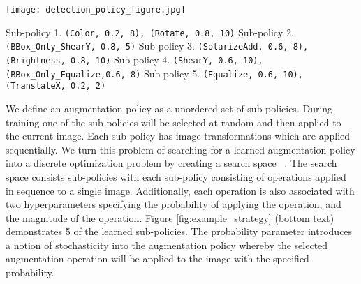 \documentclass[10pt,twocolumn,letterpaper]{article}
\newcommand{\cmd}[1]{{\tt #1}}
\begin{document}
\begin{figure*}[t]
\centering
\texttt{[image: detection\_policy\_figure.jpg]}
\vspace{-0.2cm}
\small{
\begin{flushleft}
\hspace*{4.4cm} Sub-policy 1. \cmd{(Color, 0.2, 8), (Rotate, 0.8, 10)}\newline
\hspace*{4.4cm} Sub-policy 2. \cmd{(BBox\_Only\_ShearY, 0.8, 5)} \newline
\hspace*{4.4cm} Sub-policy 3. \cmd{(SolarizeAdd, 0.6, 8), (Brightness, 0.8, 10)} \newline
\hspace*{4.4cm} Sub-policy 4. \cmd{(ShearY, 0.6, 10), (BBox\_Only\_Equalize,0.6, 8)} \newline
\hspace*{4.4cm} Sub-policy 5. \cmd{(Equalize, 0.6, 10), (TranslateX, 0.2, 2)} \newline
\end{flushleft}
}
\vspace{-0.6cm}
\caption{\textbf{Examples of learned augmentation sub-policies.} 5 examples of learned sub-policies applied to one example image. Each column corresponds to a different random sample of the corresponding sub-policy. Each step of an augmentation sub-policy consists of a triplet corresponding to the operation, the probability of application and a magnitude measure. The bounding box is adjusted to maintain consistency with the applied augmentation. Note the probability and magnitude are discretized values (see text for details). }
\label{fig:example_strategy}
\end{figure*}

We define an augmentation policy as a unordered set of  sub-policies. During training one of the  sub-policies will be selected at random and then applied to the current image. Each sub-policy has  image transformations which are applied sequentially. We turn this problem of searching for a learned augmentation policy into a discrete optimization problem by creating a search space ~\cite{cubuk2018autoaugment}.
The search space consists  sub-policies with each sub-policy consisting of  operations applied in sequence to a single image. Additionally, each operation is also associated with two hyperparameters specifying the probability of applying the operation, and the magnitude of the operation. Figure \ref{fig:example_strategy} (bottom text) demonstrates 5 of the learned sub-policies. 
The probability parameter introduces a notion of stochasticity into the augmentation policy whereby the selected augmentation operation will be applied to the image with the specified probability.
\end{document}
